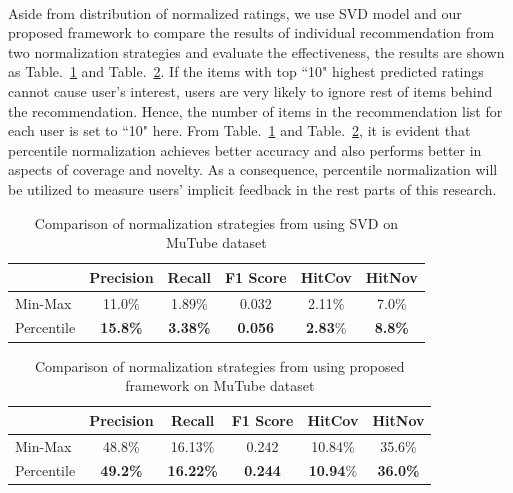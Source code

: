 \documentclass[a4paper,12pt]{report}
\begin{document}
\paragraph{}
Aside from distribution of normalized ratings, we use SVD model and our proposed framework to compare the results of individual recommendation from two normalization strategies and evaluate the effectiveness, the results are shown as Table.~\ref{tab:Normalization_strategy_SVD_MuTube} and Table.~\ref{tab:Normalization_strategy_proposed_MuTube}. If the items with top ``10" highest predicted ratings cannot cause user's interest, users are very likely to ignore rest of items behind the recommendation. Hence, the number of items in the recommendation list for each user is set to ``10" here. From Table.~\ref{tab:Normalization_strategy_SVD_MuTube} and Table.~\ref{tab:Normalization_strategy_proposed_MuTube}, it is evident that percentile normalization achieves better accuracy and also performs better in aspects of coverage and novelty. As a consequence, percentile normalization will be utilized to measure users' implicit feedback in the rest parts of this research.

\begin{table}[!hbtp]
    \centering
    \caption{Comparison of normalization strategies from using SVD on MuTube dataset}
    \begin{tabular}{| l || c c c || c c|}
    \hline
    & \textbf{Precision} & \textbf{Recall} & \textbf{F1 Score} & \textbf{HitCov} & \textbf{HitNov}\\
    \hline
    Min-Max &  11.0\% & 1.89\% & 0.032 & 2.11\% & 7.0\% \\ 
    Percentile & \textbf{15.8\%} & \textbf{3.38\%} & \textbf{0.056} & \textbf{2.83}\% & \textbf{8.8\%} \\
    \hline
    \end{tabular}
    \label{tab:Normalization_strategy_SVD_MuTube}
\end{table}

\begin{table}[!hbtp]
    \centering
    \caption{Comparison of normalization strategies from using proposed framework on MuTube dataset}
    \begin{tabular}{| l || c c c || c c|}
    \hline
    & \textbf{Precision} & \textbf{Recall} & \textbf{F1 Score} & \textbf{HitCov} & \textbf{HitNov}\\
    \hline
    Min-Max &  48.8\% & 16.13\% & 0.242 & 10.84\% & 35.6\% \\ 
    Percentile & \textbf{49.2\%} & \textbf{16.22\%} & \textbf{0.244} & \textbf{10.94}\% & \textbf{36.0\%} \\
    \hline
    \end{tabular}
    \label{tab:Normalization_strategy_proposed_MuTube}
\end{table}
\end{document}
